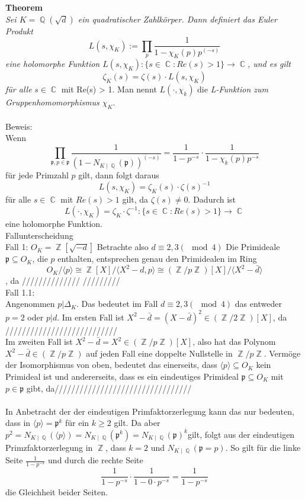 \documentclass[10pt,a4paper]{article}
\DeclareMathOperator{\C}{\mathbb{C}}
\DeclareMathOperator{\Q}{\mathbb{Q}}
\DeclareMathOperator{\Z}{\mathbb{Z}}
\begin{document}
\textbf{Theorem}
\\
\textit{Sei $K=\Q(\sqrt{d})$ ein quadratischer Zahlkörper. Dann definiert das Euler Produkt $$L(s,\chi_K) := \prod_{p}\frac{1}{1-\chi_K(p)p^{(-s)}} $$ eine holomorphe Funktion $L(s,\chi_K) \colon \{s \in \C \colon Re(s) > 1\} \rightarrow \C$, und es gilt $$\zeta_K(s) = \zeta(s)\cdot L(s,\chi_K) $$ für alle }$s \in \C$ mit Re(s) > 1. Man nennt $L(\cdot,\chi_k)$ die \textit{L-Funktion zum Gruppenhomomorphismus $\chi_K$}.
\\
\\
Beweis: 
\\
Wenn $$\prod_{\mathfrak{p},p \in \mathfrak{p}}\frac{1}{(1- N_{K\mid \Q}(\mathfrak{p}))^{(-s)}}= \frac{1}{1-p^{-s}}\cdot\frac{1}{1-\chi_k(p)p^{-s}}$$ für jede Primzahl $p$ gilt, dann folgt daraus $$L(s,\chi_K)= \zeta_K(s)\cdot \zeta(s)^{-1}$$ für alle $s \in \C$ mit $Re(s)>1$ gilt, da $\zeta(s) \neq 0$. Dadurch ist $$L(\cdot,\chi_K)= \zeta_K\cdot \zeta^{-1}\colon \{s \in \C \colon Re(s)>1\}\rightarrow \C$$ eine holomorphe Funktion.
\\
Fallunterscheidung
\\
Fall 1: $O_K= \Z[\sqrt{-d}]$
Betrachte also $d\equiv2,3 (\mod 4)$
Die Primideale $\mathfrak{p} \subseteq O_K$, die $p$ enthalten, entsprechen genau den Primidealen im Ring $$O_K /\langle p\rangle \cong \Z[X] /\langle X^2-d,p\rangle \cong (\Z/p\Z)[X]/\langle X^2-\bar{d}\rangle $$, da //////////////
/////////
\\
Fall 1.1:
\\
Angenommen $p | \Delta_K$. Das bedeutet im Fall $d \equiv2,3 (\mod 4)$ das entweder $p = 2$ oder $p|d$. Im ersten Fall ist $X^2-\bar{d} = (X-\bar{d})^2 \in (\Z/2\Z)[X]$, da ///////////////////////////
\\
Im zweiten Fall ist $X^2-\bar{d} = X^2 \in (\Z/p\Z)[X]$, also hat das Polynom $X^2-\bar{d} \in (\Z/p\Z)$ auf jeden Fall eine doppelte Nullstelle in $\Z/p\Z$. Vermöge der Isomorphismus von oben, bedeutet das einerseits, dass $\langle p\rangle \subseteq O_K$ kein Primideal ist und andererseits, dass es ein eindeutiges Primideal $\mathfrak{p} \subseteq O_K$ mit $p \in \mathfrak{p}$ gibt, da/////////////////////////////////
\\
\\
In Anbetracht der der eindeutigen Primfaktorzerlegung kann das nur bedeuten, dass in $\langle p\rangle =\mathfrak{p}^k$ für ein $k\geq 2$ gilt. Da aber $p^2=N_{K\mid \Q}(\langle p\rangle)=N_{K\mid \Q}(\mathfrak{p}^k) =N_{K\mid \Q}(\mathfrak{p})^k $gilt, folgt aus der eindeutigen Primzfaktorzerlegung in $\Z$, dass $k = 2$ und $N_{K\mid\Q}(\mathfrak{p}=p)$. So gilt für die linke Seite $\frac{1}{1-p^{-s}}$ und durch die rechte Seite $$\frac{1}{1-p^{-s}}\cdot \frac{1}{1-0\cdot p^{-s}}=\frac{1}{1-p^{-s}}$$ die Gleichheit beider Seiten.
\end{document}
